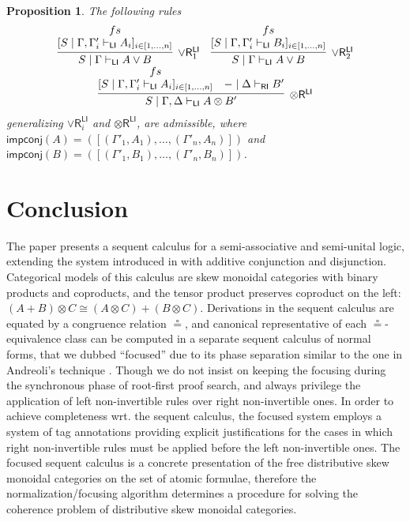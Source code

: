 \documentclass[submission,copyright,creativecommons]{eptcs}
\newtheorem{proposition}[theorem]{Proposition}
\theoremstyle{definition}
\newcommand{\tr}{\otimes \mathsf{R}}
\newcommand{\orrone}{\lor \mathsf{R}_{1}}
\newcommand{\orrtwo}{\lor \mathsf{R}_{2}}
\newcommand{\orri}{\lor \mathsf{R}_{i}}
\newcommand{\ot}{\otimes}
\newcommand{\RI}{\mathsf{RI}}
\newcommand{\LI}{\mathsf{LI}}
\newcommand{\impconj}[1]{\mathsf{impconj} (#1)}
\newcommand\niccolo[1]{\mbox{}
{\marginpar{\color{red}NV}}
{\sf\noindent\color{red}#1}}%
\begin{document}
\begin{proposition}\label{prop:GenRightRules:impl}
  The following rules
  \begin{displaymath}
    \begin{array}{c}
      \infer[\orrone^{\LI}]{S \mid \Gamma \vdash_{\LI} A \lor B}{
        \deduce{[S \mid \Gamma , \Gamma'_i \vdash_{\LI} A_i]_{i \in [1 , \dots , n]}}{fs}
      }
      \quad
      \infer[\orrtwo^{\LI}]{S \mid \Gamma \vdash_{\LI} A \lor B}{
        \deduce{[S \mid \Gamma , \Gamma'_i \vdash_{\LI} B_i]_{i \in [1 , \dots , n]}}{fs}
      }
      \\
      \infer[\tr^{\LI}]{S \mid \Gamma , \Delta \vdash_{\LI} A \ot B'}{
        \deduce{[S \mid \Gamma , \Gamma'_i \vdash_{\LI} A_i]_{i \in [1 , \dots , n]}}{fs}
        &
        - \mid \Delta \vdash_{\RI} B'
      }
    \end{array}
  \end{displaymath}
  generalizing $\orri^{\LI}$ and $\tr^{\LI}$, are admissible, where
  \\
  $\impconj{A} = ([(\Gamma'_1 , A_1) , \dots , (\Gamma'_n , A_n)])$ and $\impconj{B} = ([(\Gamma'_1 , B_1) , \dots , (\Gamma'_n , B_n)])$.
\end{proposition}

\section{Conclusion}
The paper presents a sequent calculus for a semi-associative and semi-unital logic,  extending the system introduced in \cite{uustalu:sequent:2021} with additive conjunction and disjunction. Categorical models of this calculus are skew monoidal categories with binary products and coproducts, and the tensor product preserves coproduct on the left: $(A + B) \ot C \cong (A \ot C) + (B \ot C)$.
Derivations in the sequent calculus are equated by a congruence relation $\circeq$, and canonical representative of each $\circeq$-equivalence class can be computed in a separate sequent calculus of normal forms, that we dubbed ``focused'' due to its phase separation similar to the one in Andreoli's technique \cite{andreoli:logic:1992}.  Though we do not insist on keeping the focusing during the synchronous phase of root-first proof search, and always privilege the application of left non-invertible rules over right non-invertible ones. In order to achieve completeness wrt. the sequent calculus, the focused system employs a system of tag annotations providing explicit justifications for the cases in which right non-invertible rules must be applied before the left non-invertible ones.
The focused sequent calculus is a concrete presentation of the free distributive skew monoidal categories on the set of atomic formulae, therefore the normalization/focusing algorithm determines a procedure for solving the coherence problem of distributive skew monoidal categories.
\end{document}
